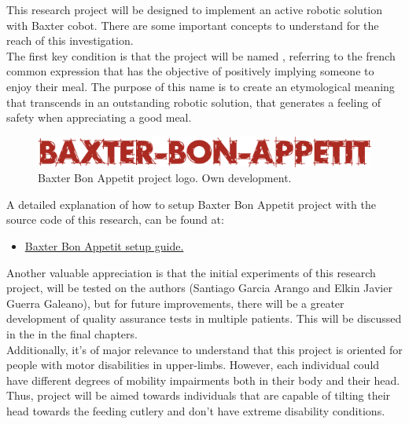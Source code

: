 \documentclass[11pt]{report} %
\begin{document}
This research project will be designed to implement an active robotic solution with Baxter cobot. There are some important concepts to understand for the reach of this investigation.\\

The first key condition is that the project will be named , referring to the french common expression that has the objective of positively implying someone to enjoy their meal. The purpose of this name is to create an etymological meaning that transcends in an outstanding robotic solution, that generates a feeling of safety when appreciating a good meal.\\

\begin{figure}[H]
    \centering
    \includegraphics[width=0.7\linewidth]{assets/imgs/methodology/baxter_bon_appetit_logo.png}
    \caption{Baxter Bon Appetit project logo. Own development.} 
    \label{fig_baxter_bon_appetit_logo}
\end{figure}

A detailed explanation of how to setup Baxter Bon Appetit project with the source code of this research, can be found at:

\begin{itemize}
    \color{blue}
    \item \href{https://github.com/san99tiago/baxter-bon-appetit/blob/main/setup_baxter_bon_appetit.md}{Baxter Bon Appetit setup guide.}
\end{itemize}

Another valuable appreciation is that the initial experiments of this research project, will be tested on the authors (Santiago Garcia Arango and Elkin Javier Guerra Galeano), but for future improvements, there will be a greater development of quality assurance tests in multiple patients. This will be discussed in the  in the final chapters.\\

Additionally, it's of major relevance to understand that this project is oriented for people with motor disabilities in upper-limbs. However, each individual could have different degrees of mobility impairments both in their body and their head. Thus,  project will be aimed towards individuals that are capable of tilting their head towards the feeding cutlery and don't have extreme disability conditions.\\
\end{document}
